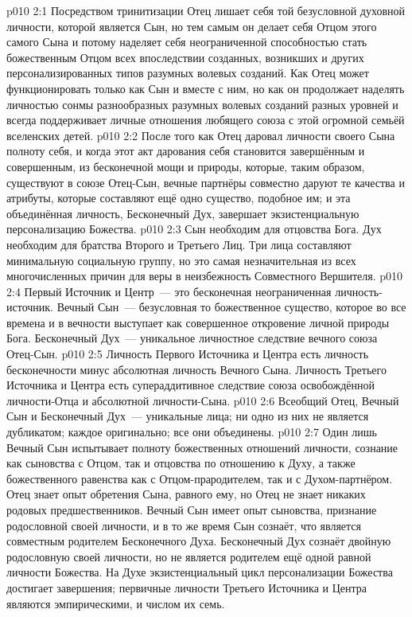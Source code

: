 \vs p010 2:1 Посредством тринитизации Отец лишает себя той безусловной духовной личности, которой является Сын, но тем самым он делает себя Отцом этого самого Сына и потому наделяет себя неограниченной способностью стать божественным Отцом всех впоследствии созданных, возникших и  других персонализированных типов разумных волевых созданий. Как  Отец может функционировать только как Сын и вместе с ним, но как  он продолжает наделять личностью сонмы разнообразных разумных волевых созданий разных уровней и всегда поддерживает личные отношения любящего союза с этой огромной семьёй вселенских детей.
\vs p010 2:2 После того как Отец даровал личности своего Сына полноту себя, и когда этот акт дарования себя становится завершённым и совершенным, из бесконечной мощи и природы, которые, таким образом, существуют в союзе Отец\hyp{}Сын, вечные партнёры совместно даруют те качества и атрибуты, которые составляют ещё одно существо, подобное им; и эта объединённая личность, Бесконечный Дух, завершает экзистенциальную персонализацию Божества.
\vs p010 2:3 Сын необходим для отцовства Бога. Дух необходим для братства Второго и Третьего Лиц. Три лица составляют минимальную социальную группу, но это самая незначительная из всех многочисленных причин для веры в неизбежность Совместного Вершителя.
\vs p010 2:4 \pc Первый Источник и Центр~--- это бесконечная  неограниченная личность\hyp{}источник. Вечный Сын~--- безусловная  то божественное существо, которое во все времена и в вечности выступает как совершенное откровение личной природы Бога. Бесконечный Дух~---  уникальное личностное следствие вечного союза Отец\hyp{}Сын.
\vs p010 2:5 \pc Личность Первого Источника и Центра есть личность бесконечности минус абсолютная личность Вечного Сына. Личность Третьего Источника и Центра есть супераддитивное следствие союза освобождённой личности\hyp{}Отца и абсолютной личности\hyp{}Сына.
\vs p010 2:6 \pc Всеобщий Отец, Вечный Сын и Бесконечный Дух~--- уникальные лица; ни одно из них не является дубликатом; каждое оригинально; все они объединены.
\vs p010 2:7 \pc Один лишь Вечный Сын испытывает полноту божественных отношений личности, сознание как сыновства с Отцом, так и отцовства по отношению к Духу, а также божественного равенства как с Отцом\hyp{}прародителем, так и с Духом\hyp{}партнёром. Отец знает опыт обретения Сына, равного ему, но Отец не знает никаких родовых предшественников. Вечный Сын имеет опыт сыновства, признание родословной своей личности, и в то же время Сын сознаёт, что является совместным родителем Бесконечного Духа. Бесконечный Дух сознаёт двойную родословную своей личности, но не является родителем ещё одной равной личности Божества. На Духе экзистенциальный цикл персонализации Божества достигает завершения; первичные личности Третьего Источника и Центра являются эмпирическими, и числом их семь.
